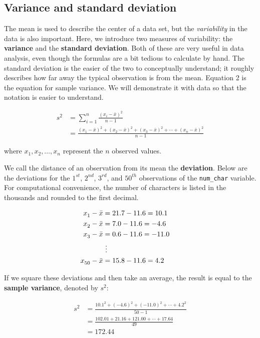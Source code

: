 \documentclass[
  letterpaper,
  DIV=11,
  numbers=noendperiod]{scrreprt}
\begin{document}
\subsection{Variance and standard
deviation}\label{variance-and-standard-deviation}

The mean is used to describe the center of a data set, but the
\emph{variability} in the data is also important. Here, we introduce two
measures of variability: the \textbf{variance} and the \textbf{standard
deviation}. Both of these are very useful in data analysis, even though
the formulas are a bit tedious to calculate by hand. The standard
deviation is the easier of the two to conceptually understand; it
roughly describes how far away the typical observation is from the mean.
Equation 2 is the equation for sample variance. We will demonstrate it
with data so that the notation is easier to understand.

\begin{align}
s_{}^2 &= \sum_{i = 1}^{n} \frac{(x_i - \bar{x})^2}{n - 1} \\
    &= \frac{(x_1 - \bar{x})^2 + (x_2 - \bar{x})^2 + (x_3 - \bar{x})^2 + \cdots + (x_n - \bar{x})^2}{n - 1} 
  \tag{2}
\end{align}

where \(x_1, x_2, \dots, x_n\) represent the \(n\) observed values.

We call the distance of an observation from its mean the
\textbf{deviation}. Below are the deviations for the \(1^{st}\),
\(2^{nd}\), \(3^{rd}\), and \(50^{th}\) observations of the
\texttt{num\_char} variable. For computational convenience, the number
of characters is listed in the thousands and rounded to the first
decimal.

\[
\begin{aligned}
x_1^{}-\bar{x} &= 21.7 - 11.6 = 10.1 \hspace{5mm}\text{ } \\
x_2^{}-\bar{x} &= 7.0 - 11.6 = -4.6 \\
x_3^{}-\bar{x} &= 0.6 - 11.6 = -11.0 \\
            &\ \vdots \\
x_{50}^{}-\bar{x} &= 15.8 - 11.6 = 4.2
\end{aligned}
\]

If we square these deviations and then take an average, the result is
equal to the \textbf{sample variance}, denoted by \(s_{}^2\):

\[
\begin{aligned}
s_{}^2 &= \frac{10.1_{}^2 + (-4.6)_{}^2 + (-11.0)_{}^2 + \cdots + 4.2_{}^2}{50-1} \\
    &= \frac{102.01 + 21.16 + 121.00 + \cdots + 17.64}{49} \\
    &= 172.44
\end{aligned}
\]
\end{document}

